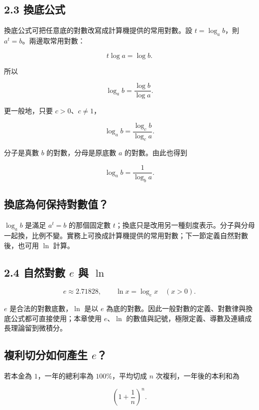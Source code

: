 \documentclass[11pt,a4paper]{article}
\begin{document}
\subsection{2.3 換底公式}\label{ux63dbux5e95ux516cux5f0f}

換底公式可把任意底的對數改寫成計算機提供的常用對數。設 \(t=\log_a b\)，則 \(a^t=b\)。兩邊取常用對數：

\[
t\log a=\log b.
\]

所以

\[
\boxed{\log_a b=\frac{\log b}{\log a}}.
\]

更一般地，只要 \(c>0\)、\(c\ne1\)，

\[
\log_a b=\frac{\log_c b}{\log_c a}.
\]

分子是真數 \(b\) 的對數，分母是原底數 \(a\) 的對數。由此也得到

\[
\log_a b=\frac1{\log_b a}.
\]

\subsection{換底為何保持對數值？}\label{ux63dbux5e95ux70baux4f55ux4fddux6301ux5c0dux6578ux503c}

\(\log_a b\) 是滿足 \(a^t=b\) 的那個固定數 \(t\)；換底只是改用另一種刻度表示。分子與分母一起換，比例不變。實務上可換成計算機提供的常用對數；下一節定義自然對數後，也可用 \(\ln\) 計算。

\subsection{\texorpdfstring{2.4 自然對數 \(e\) 與 \(\ln\)}{2.4 自然對數 e 與 \textbackslash ln}}\label{ux81eaux7136ux5c0dux6578-e-ux8207-ln}

\[
\boxed{e\approx2.71828},
\qquad
\boxed{\ln x=\log_e x}\quad(x>0).
\]

\(e\) 是合法的對數底數，\(\ln\) 是以 \(e\) 為底的對數。因此一般對數的定義、對數律與換底公式都可直接使用；本章使用 \(e\)、\(\ln\) 的數值與記號，極限定義、導數及連續成長理論留到微積分。

\subsection{\texorpdfstring{複利切分如何產生 \(e\)？}{複利切分如何產生 e？}}\label{ux8907ux5229ux5207ux5206ux5982ux4f55ux7522ux751f-e}

若本金為 \(1\)，一年的總利率為 \(100\%\)，平均切成 \(n\) 次複利，一年後的本利和為

\[
\left(1+\frac1n\right)^n.
\]
\end{document}
